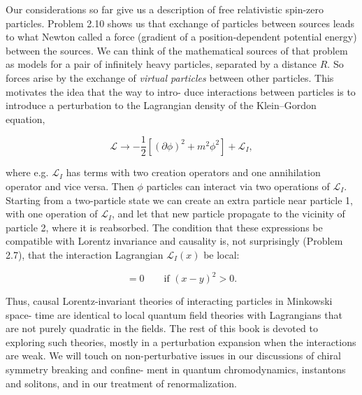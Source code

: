 
Our considerations so far give us a description of free relativistic spin-zero particles.
Problem 2.10 shows us that exchange of particles between sources leads to what Newton
called a force (gradient of a position-dependent potential energy) between the sources.
We can think of the mathematical sources of that problem as models for a pair of
infinitely heavy particles, separated by a distance $R$. So forces arise by the exchange of
\emph{virtual particles} between other particles. This motivates the idea that the way to intro-
duce interactions between particles is to introduce a perturbation to the Lagrangian
density of the Klein--Gordon equation,

\begin{equation}
  \mathcal L\to-\frac{1}{2}\left[(\partial\phi)^2+m^2\phi^2\right]+\mathcal L_I,
  \label{eq:3.1}
\end{equation}

where e.g. $\mathcal L_I$ has terms with two creation operators and one annihilation operator
and vice versa. Then $\phi$ particles can interact via two operations of $\mathcal L_I$. Starting from
a two-particle state we can create an extra particle near particle 1, with one operation
of $\mathcal L_I$, and let that new particle propagate to the vicinity of particle 2, where it is
reabsorbed. The condition that these expressions be compatible with Lorentz invariance
and causality is, not surprisingly (Problem 2.7), that the interaction Lagrangian $\mathcal L_I(x)$
be local:

\begin{equation}
  [\mathcal L_I(x),\mathcal L_I(y)]=0\qquad\text{if }(x-y)^2>0.
  \label{eq:3.2}
\end{equation}

Thus, causal Lorentz-invariant theories of interacting particles in Minkowski space-
time are identical to local quantum field theories with Lagrangians that are not purely
quadratic in the fields. The rest of this book is devoted to exploring such theories,
mostly in a perturbation expansion when the interactions are weak. We will touch on
non-perturbative issues in our discussions of chiral symmetry breaking and confine-
ment in quantum chromodynamics, instantons and solitons, and in our treatment of
renormalization.

